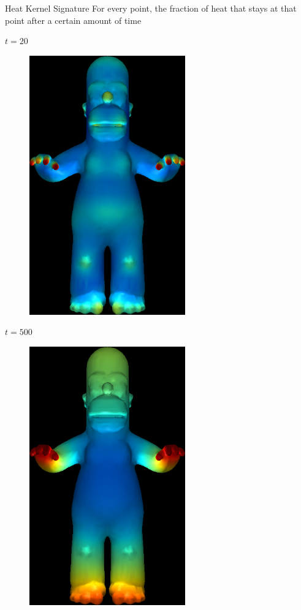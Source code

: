 \documentclass{beamer}
\begin{document}
\begin{frame}{Heat Kernel Signature}
For every point, the fraction of heat that stays at that point after a certain amount of time


\begin{minipage}{0.45\textwidth}{
$t = 20$
\begin{figure}[t]
    \includegraphics[width=0.6\textwidth]{HomerHKS_20.png}
\end{figure}
}
\end{minipage}
\begin{minipage}{0.45\textwidth}
$t = 500$
\begin{figure}[t]
    \includegraphics[width=0.6\textwidth]{HomerHKS_500.png}
\end{figure}
\end{minipage} \\



\end{frame}
\end{document}
